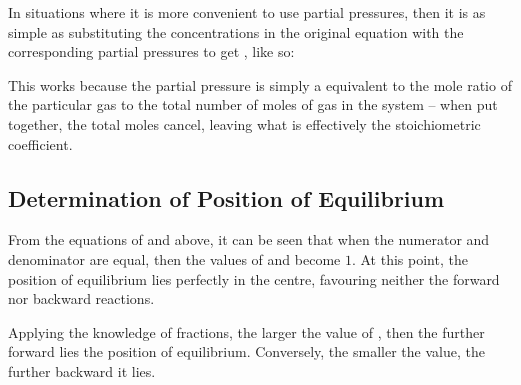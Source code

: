 			In situations where it is more convenient to use partial pressures, then it is as simple as substituting the concentrations
			in the original \Kc{} equation with the corresponding partial pressures to get \Kp{}, like so:


			This works because the partial pressure is simply a equivalent to the mole ratio of the particular gas to the total number of
			moles of gas in the system -- when put together, the total moles cancel, leaving what is effectively the stoichiometric
			coefficient.



		\pagebreak
		\subsection{Determination of Position of Equilibrium}

			From the equations of \Kc{} and \Kp{} above, it can be seen that when the numerator and denominator are equal, then the values of
			\Kc{} and \Kp{} become $1$. At this point, the position of equilibrium lies perfectly in the centre, favouring neither the forward
			nor backward reactions.

			Applying the knowledge of fractions, the larger the value of \Kc{}, then the further forward lies the position of equilibrium.
			Conversely, the smaller the value, the further backward it lies.

			\begin{center}
			\end{center}

